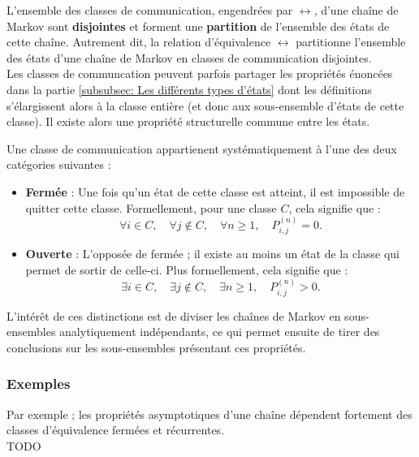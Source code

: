 \documentclass{article}
\begin{document}
L'ensemble des classes de communication, engendrées par $\leftrightarrow$, d'une chaîne de Markov sont \textbf{disjointes} et forment une \textbf{partition} de l'ensemble des états de cette chaîne.
Autrement dit, la relation d'équivalence $\leftrightarrow$ partitionne l'ensemble des états d'une chaîne de Markov en classes de communication disjointes. \\ %

Les classes de communcation peuvent parfois partager les propriétés énoncées dans la partie \ref{subsubsec: Les différents types d'états} dont les définitions s'élargissent alors à la classe entière (et donc aux sous-ensemble d'états de cette classe). Il existe alors une propriété structurelle commune entre les états.

\begin{tcolorbox}[colback=white,colframe=blue!80!black,title=Qualificatif ouvert/fermé pour une classe de communication]
Une classe de communication appartienent systématiquement à l'une des deux catégories suivantes :
\begin{itemize}
\item \textbf{Fermée} : Une fois qu'un état de cette classe est atteint, il est impossible de quitter cette classe. Formellement, pour une classe $C$, cela signifie que :
  \[
  \forall i \in C, \quad \forall j \notin C, \quad \forall n \geq 1, \quad P_{i,j}^{(n)} = 0.
  \]
\item \textbf{Ouverte} : L'opposée de fermée ; il existe au moins un état de la classe qui permet de sortir de celle-ci. Plus formellement, cela signifie que :
  \[
  \exists i \in C, \quad \exists j \notin C, \quad \exists n \geq 1, \quad P_{i,j}^{(n)} > 0.
  \]
\end{itemize}
\end{tcolorbox}

L'intérêt de ces distinctions est de diviser les chaînes de Markov en sous-ensembles analytiquement indépendants, ce qui permet ensuite de tirer des conclusions sur les sous-ensembles présentant ces propriétés.

\subsubsection{Exemples}
Par exemple ; les propriétés asymptotiques d'une chaîne dépendent fortement des classes d'équivalence fermées et récurrentes. \\ %
TODO \\
\end{document}
